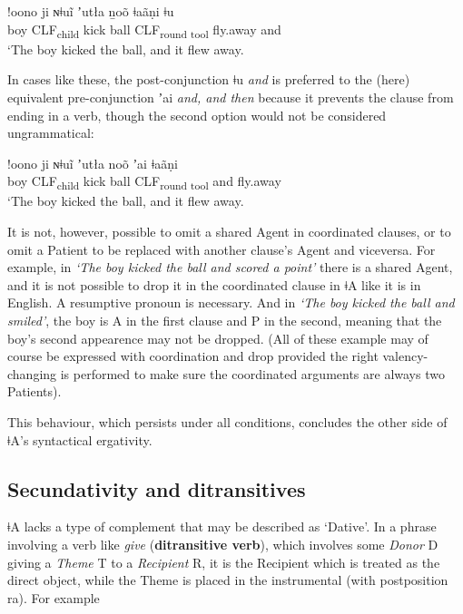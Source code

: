 \documentclass[11pt,a5paper]{book}
\newcommand{\qcn}[1]{\textcolor{AccentText}{\large#1}}
\newcommand{\langname}{\qcn{ǂA}}
\newcommand{\transl}[2]{\qcn{#1} \emph{#2}}
\newcommand{\grammsc}[1]{\textsc{#1}}
\newcommand{\CLF}[1]{\grammsc{CLF}\textsubscript{#1}}
\begin{document}
\begin{exe}
\ex
\gll !oono 	ji 	ɴǂuĩ 	 	ʼutła 	ṉoõ  ǂaãṇi ǂu\\
boy 	\CLF{child} 	kick 	ball 	\CLF{round tool} 	fly.away  and\\
\glt `The boy kicked the ball, and it flew away.
\end{exe}

In cases like these, the post-conjunction \transl{ǂu}{and} is preferred to the (here) equivalent pre-conjunction \transl{ʼai}{and, and then} because it prevents the clause from ending in a verb, though the second option would not be considered ungrammatical:

\begin{exe}
\ex
\gll !oono 	ji 	ɴǂuĩ 	 	ʼutła 	noõ  ʼai ǂaãṇi \\
boy 	\CLF{child} 	kick 	ball 	\CLF{round tool}   and	fly.away  \\
\glt `The boy kicked the ball, and it flew away.
\end{exe}

It is not, however, possible to omit a shared Agent in coordinated clauses, or to omit a Patient to be replaced with another clause's Agent and viceversa. For example, in \emph{`The boy kicked the ball and scored a point'} there is a shared Agent, and it is not possible to drop it in the coordinated clause in \langname{} like it is in English. A resumptive pronoun is necessary. And in \emph{`The boy kicked the ball and smiled'}, the boy is A in the first clause and P in the second, meaning that the boy's second appearence may not be dropped. (All of these example may of course be expressed with coordination and drop provided the right valency-changing is performed to make sure the coordinated arguments are always two Patients).

This behaviour, which persists under all conditions, concludes the other side of \langname's syntactical ergativity.

\subsection{Secundativity and ditransitives}

\langname{} lacks a type of complement that may be described as `Dative'. In a phrase involving a verb like \emph{give} (\textbf{ditransitive verb}), which involves some \emph{Donor} D giving a \emph{Theme} T to a \emph{Recipient} R, it is the Recipient which is treated as the direct object, while the Theme is placed in the instrumental (with postposition \qcn{ra}). For example
\end{document}
